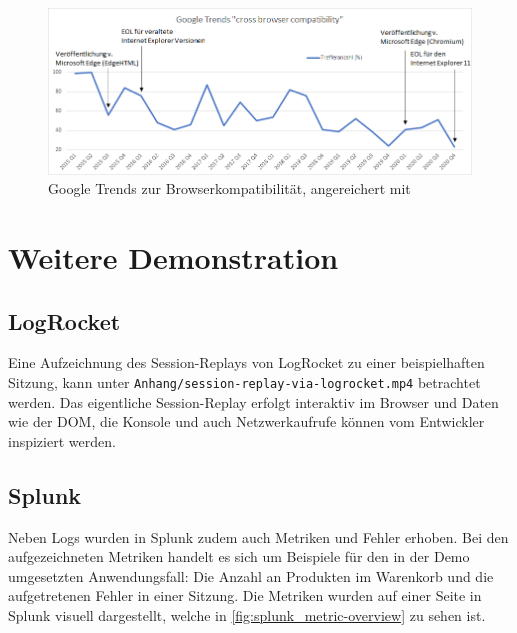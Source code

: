 \begin{figure}[H]
	\centering
	\includegraphics[width=0.84\linewidth]{img/99_postscript/google-trends_cross-browser-compatability.png}
	\caption{Google Trends zur Browserkompatibilität, angereichert mit \cite{MicrosoftIEandEdgeLifecycleFAQ}}
	\label{fig:google-search-trends_cross-browser-compatability}
\end{figure}

\section{Weitere Demonstration}
\label{sec:weitere-demonstration}

\subsection{LogRocket}
\label{sec:demo-logrocket}

Eine Aufzeichnung des Session-Replays von LogRocket zu einer beispielhaften Sitzung, kann unter \texttt{Anhang/session-replay-via-logrocket.mp4} betrachtet werden. Das eigentliche Session-Replay erfolgt interaktiv im Browser und Daten wie der DOM, die Konsole und auch Netzwerkaufrufe können vom Entwickler inspiziert werden.

\subsection{Splunk}
\label{sec:demo-splunk}

Neben Logs wurden in Splunk zudem auch Metriken und Fehler erhoben. Bei den aufgezeichneten Metriken handelt es sich um Beispiele für den in der Demo umgesetzten Anwendungsfall: Die Anzahl an Produkten im Warenkorb und die aufgetretenen Fehler in einer Sitzung. Die Metriken wurden auf einer Seite in Splunk visuell dargestellt, welche in \autoref{fig:splunk_metric-overview} zu sehen ist.

